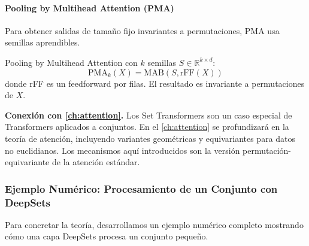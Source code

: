 \paragraph{Pooling by Multihead Attention (PMA)}

Para obtener salidas de tamaño fijo invariantes a permutaciones, PMA usa semillas aprendibles.

\begin{definition}[PMA]\label{def:pma}
Pooling by Multihead Attention con $k$ semillas $S \in \mathbb{R}^{k \times d}$:
\begin{equation}
\text{PMA}_k(X) = \text{MAB}(S, \text{rFF}(X))
\end{equation}
donde rFF es un feedforward por filas. El resultado es invariante a permutaciones de $X$.
\end{definition}

\textbf{Conexión con \autoref{ch:attention}.} Los Set Transformers son un caso especial de Transformers aplicados a conjuntos. En el \autoref{ch:attention} se profundizará en la teoría de atención, incluyendo variantes geométricas y equivariantes para datos no euclidianos. Los mecanismos aquí introducidos son la versión permutación-equivariante de la atención estándar.

\subsubsection{Ejemplo Numérico: Procesamiento de un Conjunto con DeepSets}

Para concretar la teoría, desarrollamos un ejemplo numérico completo mostrando cómo una capa DeepSets procesa un conjunto pequeño.

